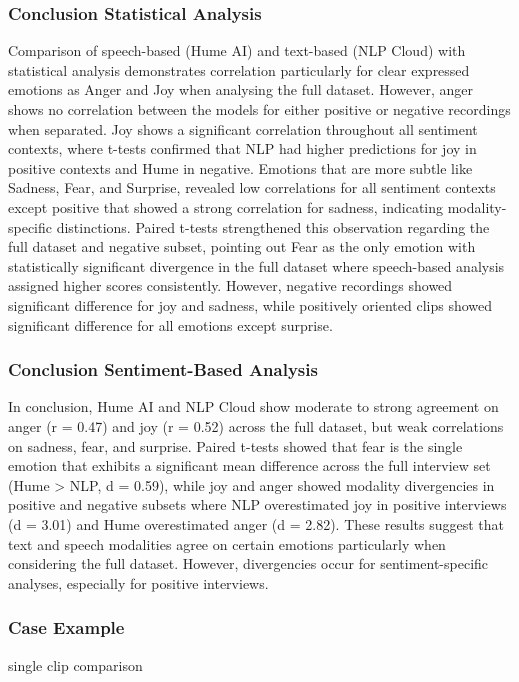 \subsubsection{Conclusion Statistical Analysis}
Comparison of speech-based (Hume AI) and text-based (NLP Cloud) with statistical analysis demonstrates correlation particularly for clear expressed emotions as Anger and Joy when analysing the full dataset. 
However, anger shows no correlation between the models for either positive or negative recordings when separated. Joy shows a significant correlation throughout all sentiment contexts, 
where t-tests confirmed that NLP had higher predictions for joy in positive contexts and Hume in negative. 
Emotions that are more subtle like Sadness, Fear, and Surprise, revealed low correlations for all sentiment contexts except positive that showed a strong correlation for sadness, indicating modality-specific distinctions. 
Paired t-tests strengthened this observation regarding the full dataset and negative subset, pointing out Fear as the only emotion with statistically significant divergence in the full dataset where speech-based analysis assigned higher scores consistently. 
However, negative recordings showed significant difference for joy and sadness, while positively oriented clips showed significant difference for all emotions except surprise. 







\subsubsection{Conclusion Sentiment-Based Analysis}
In conclusion, Hume AI and NLP Cloud show moderate to strong agreement on anger (r = 0.47) and joy (r = 0.52) across the full dataset, but weak correlations on sadness, fear, and surprise. Paired t-tests showed that fear is the single emotion that exhibits a significant mean difference across the full interview set (Hume > NLP, d = 0.59), while joy and anger showed modality divergencies in positive and negative subsets where NLP overestimated joy in positive interviews (d = 3.01) and Hume overestimated anger (d = 2.82). These results suggest that text and speech modalities agree on certain emotions particularly when considering the full dataset. However, divergencies occur for sentiment-specific analyses, especially for positive interviews. 

\subsubsection{Case Example}
single clip comparison 

